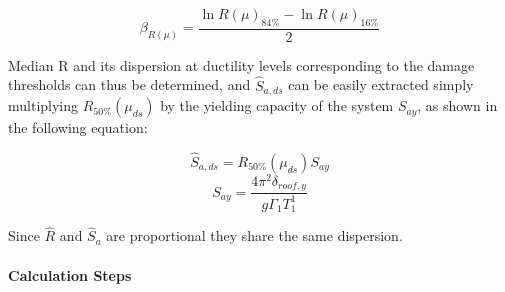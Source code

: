 \begin{equation}
\beta_{R(\mu)} = \frac{\ln R(\mu)_{84\%} - \ln R(\mu)_{16\%}}{2}
\label{eq:betaR}
\end{equation} 

Median R and its dispersion at ductility levels corresponding to the damage thresholds can thus be determined, and $\hat{S}_{a,ds}$ can be easily extracted simply multiplying $R_{50\%}(\mu_{ds})$ by the yielding capacity of the system $S_{ay}$, as shown in the following equation:

\begin{equation}
\hat{S}_{a,ds} = R_{50\%}(\mu_{ds}) S_{ay}
\label{eq:SaR}
\end{equation}
\begin{equation}
S_{ay} = \frac{4 \pi^2 \delta_{roof,y}}{g \Gamma_1 T_1^1}
\end{equation}

Since $\hat{R}$ and $\hat{S}_{a}$ are proportional they share the same dispersion.

\paragraph{Calculation Steps}

